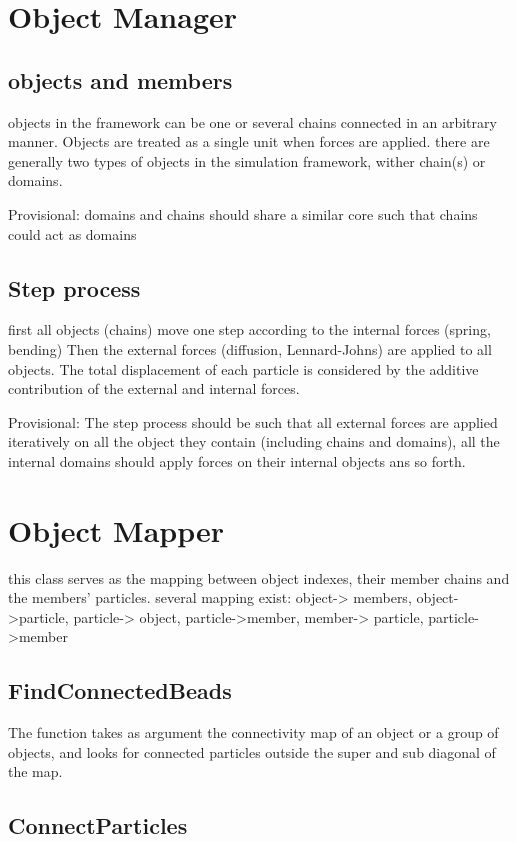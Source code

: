 \documentclass[12pt]{report}
\begin{document}
\section{Object Manager}
\subsection{objects and members}
objects in the framework can be one or several chains connected in an arbitrary manner. Objects are treated as a single unit when forces are applied. 
there are generally two types of objects in the simulation framework, wither  chain(s) or domains. 

Provisional: domains and chains should share a similar core such that chains could act as domains 

\subsection{Step process}
first all objects (chains) move one step according to the internal forces (spring, bending)
Then the external forces (diffusion, Lennard-Johns) are applied to all objects. 
The total displacement of each particle is considered by the additive contribution of the external and internal forces. 

Provisional: The step process should be such that all external forces are applied iteratively on all the object they contain (including chains and domains), all the internal domains should apply forces on their internal objects ans so forth. 

\section{Object Mapper}
this class serves as the mapping between object indexes, their member chains and the members' particles. 
several mapping exist: object-> members, object->particle, particle-> object,  particle->member, member-> particle, particle->member

\subsection{FindConnectedBeads}
The function takes as argument the connectivity map of an object or a group of objects, and looks for connected particles outside the super and sub diagonal of the map. 

\subsection{ConnectParticles}
\end{document}
